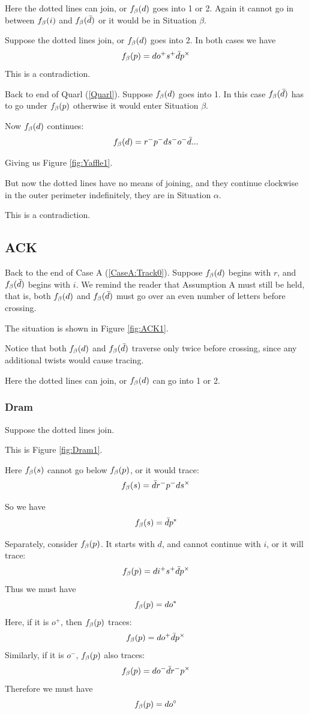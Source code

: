 Here the dotted lines can join, or $f_\beta(d)$ goes into 1 or 2. Again it cannot go in between $f_\beta(i)$ and $f_\beta(\bar{d})$ or it would be in Situation $\beta$.

Suppose the dotted lines join, or $f_\beta(d)$ goes into 2. In both cases we have
\[
f_\beta(p) = d o^+ s^+ \bar{d} p^\times
\]
This is a contradiction.


\label{Yaffle}
Back to end of Quarl (\ref{Quarl}). Suppose $f_\beta(d)$ goes into 1. In this case $f_\beta(\bar{d})$ has to go under $f_\beta(p)$ otherwise it would enter Situation $\beta$.

Now $f_\beta(d)$ continues:
\[
f_\beta(d) = r^- p^- d s^- o^- \bar{d}...
\]

Giving us Figure \ref{fig:Yaffle1}.

But now the dotted lines have no means of joining, and they continue clockwise in the outer perimeter indefinitely, they are in Situation $\alpha$.

This is a contradiction.




\subsection{ACK} \label{ACK}
Back to the end of Case A (\ref{CaseA:Track0}). Suppose $f_\beta(d)$ begins with $r$, and $f_\beta(\bar{d})$ begins with $i$. We remind the reader that Assumption A must still be held, that is, both $f_\beta(d)$ and $f_\beta(\bar{d})$ must go over an even number of letters before crossing.

The situation is shown in Figure \ref{fig:ACK1}.

Notice that both $f_\beta(d)$ and $f_\beta(\bar{d})$ traverse only twice before crossing, since any additional twists would cause tracing.

Here the dotted lines can join, or $f_\beta(d)$ can go into 1 or 2.

\subsubsection{Dram} \label{Dram}
Suppose the dotted lines join. 

This is Figure \ref{fig:Dram1}.

Here $f_\beta(s)$ cannot go below $f_\beta(p)$, or it would trace:
\[
f_\beta(s) = \bar{d} r^- p^- d s^\times
\]

So we have
\[
f_\beta(s) = \bar{d} p^*
\]

Separately, consider $f_\beta(p)$. It starts with $d$, and cannot continue with $i$, or it will trace:
\[
f_\beta(p) = d i^+ s^+ \bar{d} p^\times
\]
Thus we must have
\[
f_\beta(p) = d o^*
\]
Here, if it is $o^+$, then $f_\beta(p)$ traces:
\[
f_\beta(p) = d o^+ \bar{d} p^\times
\]
Similarly, if it is $o^-$, $f_\beta(p)$ also traces:
\[
f_\beta(p) = d o^- \bar{d} r^- p^\times
\]
Therefore we must have
\[
f_\beta(p) = d o^\circ
\]

